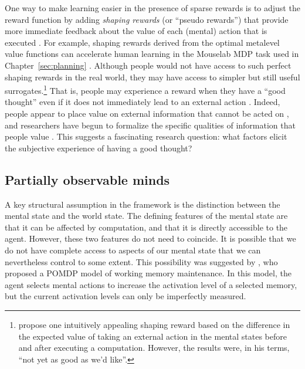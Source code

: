 One way to make learning easier in the presence of sparse rewards is to adjust the reward function by adding \emph{shaping rewards} (or ``pseudo rewards'') that provide more immediate feedback about the value of each (mental) action that is executed \citep{ng1999policy}. For example, shaping rewards derived from the optimal metalevel value functions can accelerate human learning in the Mouselab MDP task used in Chapter~\ref{sec:planning} \citep{callaway2022leveraging}. Although people would not have access to such perfect shaping rewards in the real world, they may have access to simpler but still useful surrogates.\footnote{%
  \citet{hay2016principles} propose one intuitively appealing shaping reward based on the difference in the expected value of taking an external action in the mental states before and after executing a computation. However, the results were, in his terms, ``not yet as good as we'd like''.
} That is, people may experience a reward when they have a ``good thought'' even if it does not immediately lead to an external action \citep{gopnik1998explanation}. Indeed, people appear to place value on external information that cannot be acted on \citep{eliaz2007experimental,gottlieb2018neuroscience}, and researchers have begun to formalize the specific qualities of information that people value \citep{markant2014preference,markant2016selfdirected}. This suggests a fascinating research question: what factors elicit the subjective experience of having a good thought?


\subsection{Partially observable minds}\label{sec:partially-observable}


A key structural assumption in the framework is the distinction between the mental state and the world state. The defining features of the mental state are that it can be affected by computation, and that it is directly accessible to the agent. However, these two features do not need to coincide. It is possible that we do not have complete access to aspects of our mental state that we can nevertheless control to some extent. This possibility was suggested by \citet{suchow2016deciding}, who proposed a POMDP model of working memory maintenance. In this model, the agent selects mental actions to increase the activation level of a selected memory, but the current activation levels can only be imperfectly measured.

